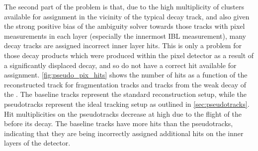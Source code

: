 
The second part of the problem is that, due to the high multiplicity of clusters available for assignment in the vicinity of the typical \highpt \bhadron decay track, and also given the strong positive bias of the ambiguity solver towards those tracks with pixel measurements in each layer (especially the innermost IBL measurement), many \bhadron decay tracks are assigned incorrect inner layer hits.
This is only a problem for those decay products which were produced within the pixel detector as a result of a significantly displaced \bhadron decay, and so do not have a correct hit available for assignment.
\cref{fig:pseudo_pix_hits} shows the number of hits as a function of the reconstructed track \pt for fragmentation tracks and tracks from the weak decay of the \bhadron.
The baseline tracks represent the standard reconstruction setup, while the pseudotracks represent the ideal tracking setup as outlined in \cref{sec:pseudotracks}.
Hit multiplicities on the pseudotracks decrease at high \pt due to the flight of the \bhadron before its decay. 
The baseline tracks have more hits than the pseudotracks, indicating that they are being incorrectly assigned additional hits on the inner layers of the detector.

